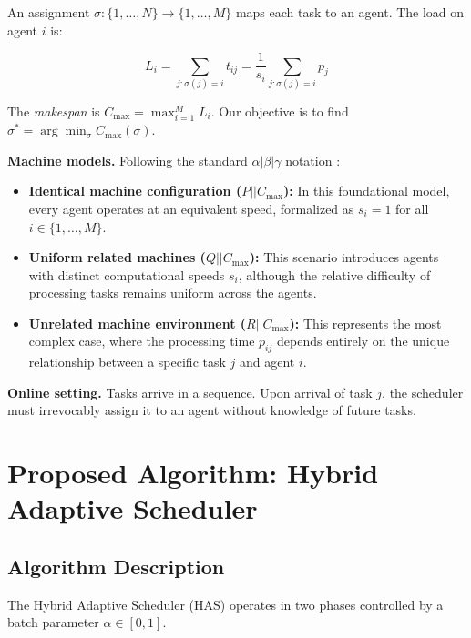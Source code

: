 \documentclass[conference]{IEEEtran}
\begin{document}
An assignment $\sigma: \{1, \ldots, N\} \rightarrow \{1, \ldots, M\}$ maps each task to an agent. The load on agent $i$ is:

\begin{equation}
    L_i = \sum_{j: \sigma(j)=i} t_{ij} = \frac{1}{s_i} \sum_{j: \sigma(j)=i} p_j
\end{equation}

The \emph{makespan} is $C_{\max} = \max_{i=1}^{M} L_i$. Our objective is to find $\sigma^* = \arg\min_\sigma C_{\max}(\sigma)$.

\textbf{Machine models.} Following the standard $\alpha|\beta|\gamma$ notation \cite{pinedo2016}:
\begin{itemize}
    \item \textbf{Identical machine configuration ($P||C_{\max}$):} In this foundational model, every agent operates at an equivalent speed, formalized as $s_i = 1$ for all $i \in \{1, \ldots, M\}$.
    \item \textbf{Uniform related machines ($Q||C_{\max}$):} This scenario introduces agents with distinct computational speeds $s_i$, although the relative difficulty of processing tasks remains uniform across the agents.
    \item \textbf{Unrelated machine environment ($R||C_{\max}$):} This represents the most complex case, where the processing time $p_{ij}$ depends entirely on the unique relationship between a specific task $j$ and agent $i$.
\end{itemize}

\textbf{Online setting.} Tasks arrive in a sequence. Upon arrival of task $j$, the scheduler must irrevocably assign it to an agent without knowledge of future tasks.

\section{Proposed Algorithm: Hybrid Adaptive Scheduler}

\subsection{Algorithm Description}

The Hybrid Adaptive Scheduler (HAS) operates in two phases controlled by a batch parameter $\alpha \in [0, 1]$.
\end{document}
